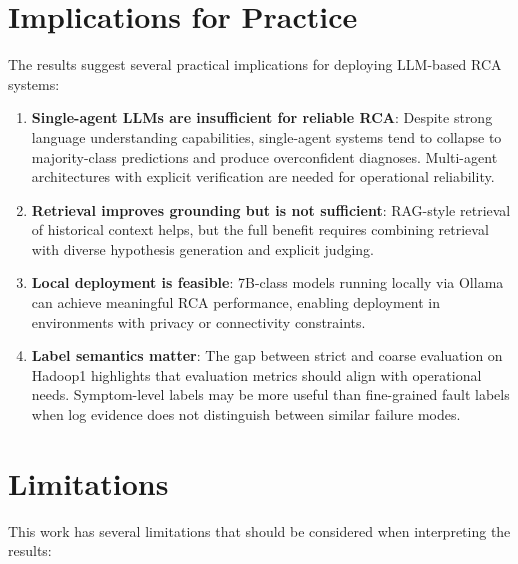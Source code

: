 \section{Implications for Practice}
The results suggest several practical implications for deploying LLM-based RCA systems:

\begin{enumerate}
  \item \textbf{Single-agent LLMs are insufficient for reliable RCA}: Despite strong language
        understanding capabilities, single-agent systems tend to collapse to majority-class
        predictions and produce overconfident diagnoses. Multi-agent architectures with explicit
        verification are needed for operational reliability.

  \item \textbf{Retrieval improves grounding but is not sufficient}: RAG-style retrieval of
        historical context helps, but the full benefit requires combining retrieval with diverse
        hypothesis generation and explicit judging.

  \item \textbf{Local deployment is feasible}: 7B-class models running locally via Ollama can
        achieve meaningful RCA performance, enabling deployment in environments with privacy or
        connectivity constraints.

  \item \textbf{Label semantics matter}: The gap between strict and coarse evaluation on Hadoop1
        highlights that evaluation metrics should align with operational needs. Symptom-level
        labels may be more useful than fine-grained fault labels when log evidence does not
        distinguish between similar failure modes.
\end{enumerate}

\section{Limitations}
This work has several limitations that should be considered when interpreting the results:

